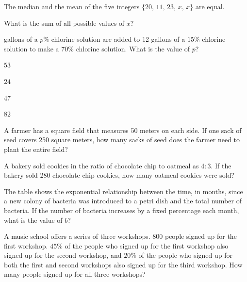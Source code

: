 \vfill
\clearpage
{}
\noindent\begin{minipage}{\linewidth}
\par\smallskip
The median and the mean of the five integers $\{20,\,11,\,23,\,x,\,x\}$ are equal.\par\smallskip What is the sum of all possible values of $x$?
\end{minipage}
\vfill
\noindent\begin{minipage}{\linewidth}
\par{} gallons of a $p\%$ chlorine solution are added to 12 gallons of a $15\%$ chlorine solution to make a $70\%$ chlorine solution. What is the value of $p$?
\begin{satchoices}
  \item[A)] $53$
  \item[B)] $24$
  \item[C)] $47$
  \item[D)] $82$
\end{satchoices}
\end{minipage}
\vfill
\noindent\begin{minipage}{\linewidth}
\par\smallskip
A farmer has a square field that measures 50 meters on each side. If one sack of seed covers 250 square meters, how many sacks of seed does the farmer need to plant the entire field?
\end{minipage}
\vfill
\clearpage
\noindent\begin{minipage}{\linewidth}
\par\smallskip
A bakery sold cookies in the ratio of chocolate chip to oatmeal as $4:3$. If the bakery sold 280 chocolate chip cookies, how many oatmeal cookies were sold?
\end{minipage}
\vfill
\noindent\begin{minipage}{\linewidth}
\par\smallskip
The table shows the exponential relationship between the time, in months, since a new colony of bacteria was introduced to a petri dish and the total number of bacteria. If the number of bacteria increases by a fixed percentage each month, what is the value of $b$?
\satfig{\figtblbacteria}
\end{minipage}
\vfill
\noindent\begin{minipage}{\linewidth}
\par\smallskip
A music school offers a series of three workshops. 800 people signed up for the first workshop. $45\%$ of the people who signed up for the first workshop also signed up for the second workshop, and $20\%$ of the people who signed up for both the first and second workshops also signed up for the third workshop. How many people signed up for all three workshops?
\end{minipage}
